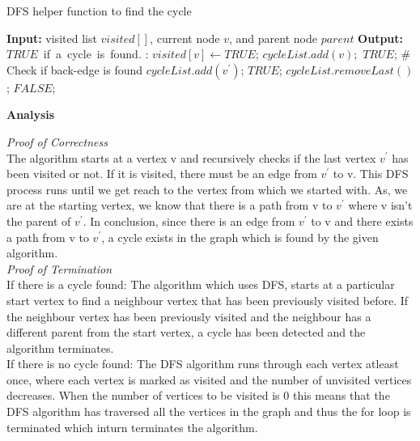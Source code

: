 \documentclass{article}
\begin{document}
\begin{algorithm}
\caption{DFS helper function to find the cycle}
\label{alg:helper}

\begin{algorithmic}[1]
\State \textbf{Input:} visited list $visited[]$, current node $v$, and parent node $parent$
\State \textbf{Output:} $TRUE$\ if\ a\ cycle\ is\ found.
:
\State $visited[v] \leftarrow TRUE$;
\State $cycleList.add(v);$
                \State \Return $TRUE$;
            \EndIf
         \# Check if back-edge is found
        \State $cycleList.add(v^{'})$;
        \State \Return $TRUE$;
        \EndIf
    \EndFor
    \State $cycleList.removeLast()$;
    \State \Return $FALSE$;
\EndFunction
\end{algorithmic}
\end{algorithm}
\textbf{Analysis}

\textit{Proof of Correctness}\\
The algorithm starts at a vertex v and recursively checks if the last vertex $v^{'}$ has been visited or not. If it is visited, there must be an edge from $v^{'}$ to v. This DFS process runs until we get reach to the vertex from which we started with. As, we are at the starting vertex, we know that there is a path from v to $v^{'}$ where v isn't the parent of $v^{'}$. In conclusion, since there is an edge from $v^{'}$ to v and there exists a path from v to $v^{'}$, a cycle exists in the graph which is found by the given algorithm.\\

\textit{Proof of Termination}\\
If there is a cycle found: The algorithm which uses DFS, starts at a particular start vertex to find a neighbour vertex that has been previously visited before. If the neighbour vertex has been previously visited and the neighbour has a different parent from the start vertex, a cycle has been detected and the algorithm terminates.\\

If there is no cycle found: The DFS algorithm runs through each vertex atleast once, where each vertex is marked as visited and the number of unvisited vertices decreases. When the number of vertices to be visited is 0 this means that the DFS algorithm has traversed all the vertices in the graph and thus the for loop is terminated which inturn terminates the algorithm.\\
\end{document}
